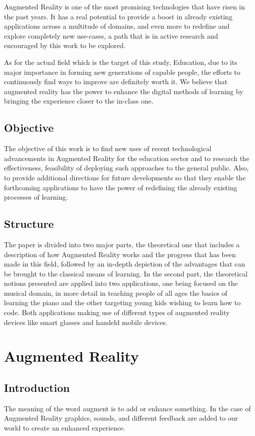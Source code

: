 \documentclass[12 pct]{report}
\begin{document}
Augmented Reality is one of the most promising technologies that have risen in the past years. It has a real potential to provide a boost in already existing applications across a multitude of domains, and even more to redefine and explore completely new use-cases, a path that is in active research and encouraged
 by this work to be explored.

As for the actual field which is the target of this study, Education, due to its major importance in forming new generations of capable people, the efforts to continuously find ways to improve are definitely worth it. We believe that augmented reality has the power to enhance the digital methods of learning by bringing the experience closer to the in-class one.
\section{Objective}
The objective of this work is to find new uses of recent technological advancements in Augmented Reality for the education sector and to research the effectiveness, feasibility of deploying such approaches to the general public. Also, to provide additional directions for future developments so that they enable the forthcoming applications to have the power of redefining the already existing processes of learning.

\section{Structure}
The paper is divided into two major parts, the theoretical one that includes a description of how Augmented Reality works and the progress that has been made in this field, followed by an in-depth depiction of the advantages that can be brought to the classical means of learning. In the second part, the theoretical notions presented are applied into two applications, one being focused on the musical domain, in more detail in teaching people of all ages the basics of learning the piano and the other targeting young kids wishing to learn how to code. Both applications making use of different types of augmented reality devices like smart glasses and handeld mobile devices.
\chapter{Augmented Reality}

\section{Introduction}
The meaning of the word augment is to add or enhance something. In the case of Augmented Reality \cite{milgram1995augmented} graphics, sounds, and different feedback are added to our world to create an enhanced experience.
\end{document}
